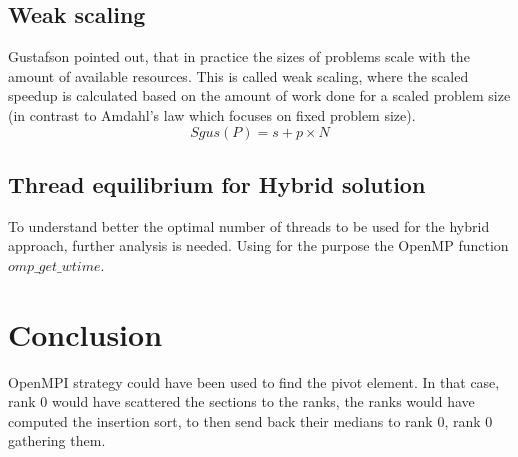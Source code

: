 \documentclass[11pt]{article}
\begin{document}
\subsection{Weak scaling}
Gustafson pointed out, that in practice the sizes of problems scale with the amount of available resources.
This is called weak scaling, where the scaled speedup is calculated based on the amount of work done for a scaled problem size (in contrast to Amdahl’s law which focuses on fixed problem size).
\begin{equation} \label{eqn}
	Sgus(P) = {s + p × N} 
\end{equation}
\subsection{Thread equilibrium for Hybrid solution}
To understand better the optimal number of threads to be used for the hybrid approach, further analysis is needed.
Using for the purpose the OpenMP function $omp\_get\_wtime$.
\section{Conclusion}
OpenMPI strategy could have been used to find the pivot element. In that case, rank 0 would have scattered the sections to the ranks, the ranks would have computed the insertion sort, to then send back their medians to rank 0, rank 0 gathering them.
\end{document}

